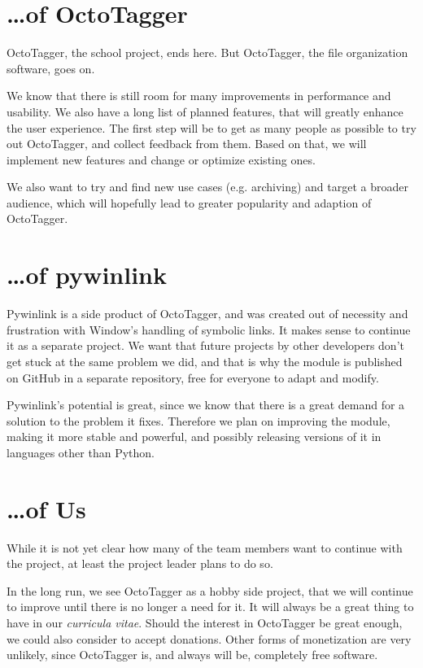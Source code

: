 \section{\ldots{}of OctoTagger}
\def\kapitelautor{Erik Ritschl}

OctoTagger, the school project, ends here. But OctoTagger, the file
organization software, goes on.

We know that there is still room for many improvements in performance and
usability. We also have a long list of planned features, that will greatly
enhance the user experience. The first step will be to get as many people as
possible to try out OctoTagger, and collect feedback from them. Based on that,
we will implement new features and change or optimize existing ones.

We also want to try and find new use cases (e.g. archiving) and target a
broader audience, which will hopefully lead to greater popularity and adaption
of OctoTagger.

\section{\ldots{}of pywinlink}
\def\kapitelautor{Erik Ritschl}

Pywinlink is a side product of OctoTagger, and was created out of necessity and
frustration with Window's handling of symbolic links. It makes sense to
continue it as a separate project. We want that future projects by other
developers don't get stuck at the same problem we did, and that is why the
module is published on GitHub in a separate repository, free for everyone to
adapt and modify.

Pywinlink's potential is great, since we know that there is a great demand for
a solution to the problem it fixes. Therefore we plan on improving the module,
making it more stable and powerful, and possibly releasing versions of it in
languages other than Python.

\section{\ldots{}of Us}
\def\kapitelautor{Erik Ritschl}

While it is not yet clear how many of the team members want to continue with
the project, at least the project leader plans to do so.

In the long run, we see OctoTagger as a hobby side project, that we will
continue to improve until there is no longer a need for it. It will always be a
great thing to have in our \emph{curricula vitae}. Should the interest in
OctoTagger be great enough, we could also consider to accept donations. Other
forms of monetization are very unlikely, since OctoTagger is, and always will
be, completely free software.
